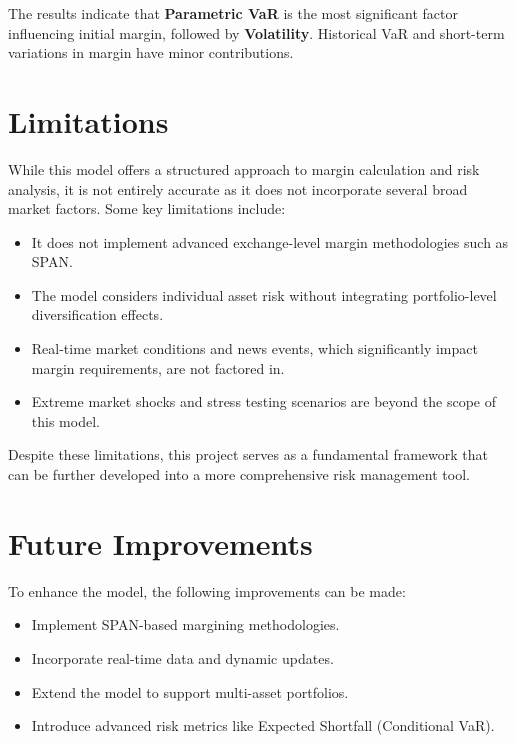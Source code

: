 \documentclass[a4paper,12pt]{article}
\begin{document}
The results indicate that \textbf{Parametric VaR} is the most significant factor influencing initial margin, followed by \textbf{Volatility}. Historical VaR and short-term variations in margin have minor contributions.




\section{Limitations}
While this model offers a structured approach to margin calculation and risk analysis, it is not entirely accurate as it does not incorporate several broad market factors. Some key limitations include:
\begin{itemize}
    \item It does not implement advanced exchange-level margin methodologies such as SPAN.
    \item The model considers individual asset risk without integrating portfolio-level diversification effects.
    \item Real-time market conditions and news events, which significantly impact margin requirements, are not factored in.
    \item Extreme market shocks and stress testing scenarios are beyond the scope of this model.
\end{itemize}
Despite these limitations, this project serves as a fundamental framework that can be further developed into a more comprehensive risk management tool.




\section{Future Improvements}
To enhance the model, the following improvements can be made:
\begin{itemize}
    \item Implement SPAN-based margining methodologies.
    \item Incorporate real-time data and dynamic updates.
    \item Extend the model to support multi-asset portfolios.
    \item Introduce advanced risk metrics like Expected Shortfall (Conditional VaR).
\end{itemize}
\end{document}
